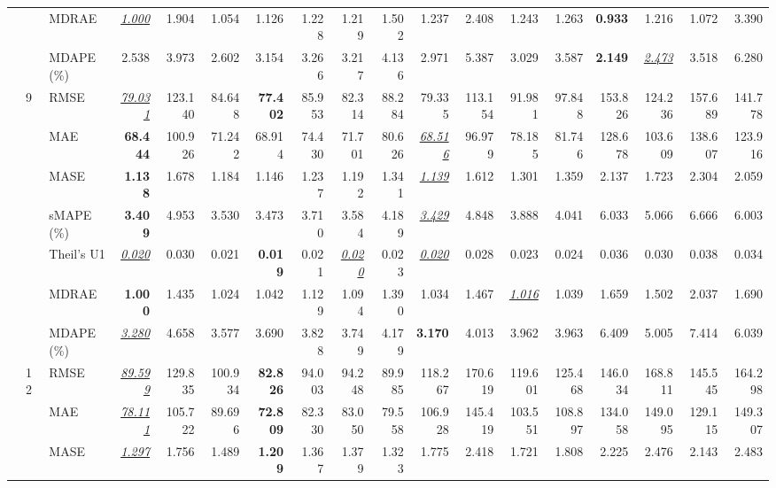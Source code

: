 \begin{table}[!htbp]
{\begin{tabular}{lllrrrrrrrrrrrrrrr}
 &  & MDRAE & \underline{\textit{1.000}} & 1.904 & 1.054 & 1.126 & 1.228 & 1.219 & 1.502 & 1.237 & 2.408 & 1.243 & 1.263 & \textbf{0.933} & 1.216 & 1.072 & 3.390 \\
 &  & MDAPE (\%) & 2.538 & 3.973 & 2.602 & 3.154 & 3.266 & 3.217 & 4.136 & 2.971 & 5.387 & 3.029 & 3.587 & \textbf{2.149} & \underline{\textit{2.473}} & 3.518 & 6.280 \\
\cmidrule(lr){2-18}
 & 9 & RMSE & \underline{\textit{79.031}} & 123.140 & 84.648 & \textbf{77.402} & 85.953 & 82.314 & 88.284 & 79.335 & 113.154 & 91.981 & 97.848 & 153.826 & 124.236 & 157.689 & 141.778 \\
 &  & MAE & \textbf{68.444} & 100.926 & 71.242 & 68.914 & 74.430 & 71.701 & 80.626 & \underline{\textit{68.516}} & 96.979 & 78.185 & 81.746 & 128.678 & 103.609 & 138.607 & 123.916 \\
 &  & MASE & \textbf{1.138} & 1.678 & 1.184 & 1.146 & 1.237 & 1.192 & 1.341 & \underline{\textit{1.139}} & 1.612 & 1.301 & 1.359 & 2.137 & 1.723 & 2.304 & 2.059 \\
 &  & sMAPE (\%) & \textbf{3.409} & 4.953 & 3.530 & 3.473 & 3.710 & 3.584 & 4.189 & \underline{\textit{3.429}} & 4.848 & 3.888 & 4.041 & 6.033 & 5.066 & 6.666 & 6.003 \\
 &  & Theil's U1 & \underline{\textit{0.020}} & 0.030 & 0.021 & \textbf{0.019} & 0.021 & \underline{\textit{0.020}} & 0.023 & \underline{\textit{0.020}} & 0.028 & 0.023 & 0.024 & 0.036 & 0.030 & 0.038 & 0.034 \\
 &  & MDRAE & \textbf{1.000} & 1.435 & 1.024 & 1.042 & 1.129 & 1.094 & 1.390 & 1.034 & 1.467 & \underline{\textit{1.016}} & 1.039 & 1.659 & 1.502 & 2.037 & 1.690 \\
 &  & MDAPE (\%) & \underline{\textit{3.280}} & 4.658 & 3.577 & 3.690 & 3.828 & 3.749 & 4.179 & \textbf{3.170} & 4.013 & 3.962 & 3.963 & 6.409 & 5.005 & 7.414 & 6.039 \\
\cmidrule(lr){2-18}
 & 12 & RMSE & \underline{\textit{89.599}} & 129.835 & 100.934 & \textbf{82.826} & 94.003 & 94.248 & 89.985 & 118.267 & 170.619 & 119.601 & 125.468 & 146.034 & 168.811 & 145.545 & 164.298 \\
 &  & MAE & \underline{\textit{78.111}} & 105.722 & 89.696 & \textbf{72.809} & 82.330 & 83.050 & 79.558 & 106.928 & 145.419 & 103.551 & 108.897 & 134.058 & 149.095 & 129.115 & 149.307 \\
 &  & MASE & \underline{\textit{1.297}} & 1.756 & 1.489 & \textbf{1.209} & 1.367 & 1.379 & 1.323 & 1.775 & 2.418 & 1.721 & 1.808 & 2.225 & 2.476 & 2.143 & 2.483 \\

\end{tabular}}
\end{table}
